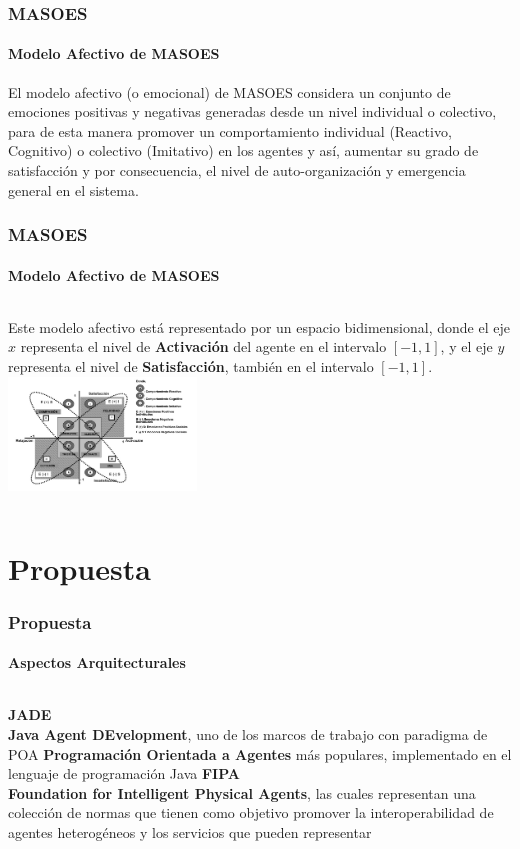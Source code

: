 \documentclass{beamer}
\begin{document}
\begin{frame}
\frametitle{MASOES}
\framesubtitle{Modelo Afectivo de MASOES}
El modelo afectivo (o emocional) de MASOES considera un conjunto de
emociones positivas y negativas generadas desde un nivel individual o colectivo,
para de esta manera promover un comportamiento individual (Reactivo, Cognitivo)
o colectivo (Imitativo) en los agentes y así, aumentar su grado de satisfacción
y por consecuencia, el nivel de auto-organización y emergencia general en el
sistema.
\end{frame}

\begin{frame}
\frametitle{MASOES}
\framesubtitle{Modelo Afectivo de MASOES}
\begin{columns}
Este modelo afectivo está representado por un espacio bidimensional,
donde el eje $x$ representa el nivel de \textbf{Activación} del agente en el
intervalo $[-1, 1]$, y el eje $y$ representa el nivel de \textbf{Satisfacción},
también en el intervalo $[-1, 1]$.
\includegraphics[width=5cm]{ilustraciones/modelo-afectivo}
\end{columns}
\end{frame}

\section{Propuesta}

\begin{frame}
\frametitle{Propuesta}
\framesubtitle{Aspectos Arquitecturales}
\begin{columns}
\textbf{JADE}\\
\textbf{Java Agent
DEvelopment}, uno de los marcos de trabajo con paradigma de POA \textbf{Programación Orientada a Agentes}
más populares, implementado en el lenguaje de programación Java
\textbf{FIPA}\\
\textbf{Foundation for Intelligent Physical Agents},
las cuales representan una colección de normas que tienen como objetivo promover la interoperabilidad
de agentes heterogéneos y los servicios que pueden representar
\end{columns}
\end{frame}
\end{document}
